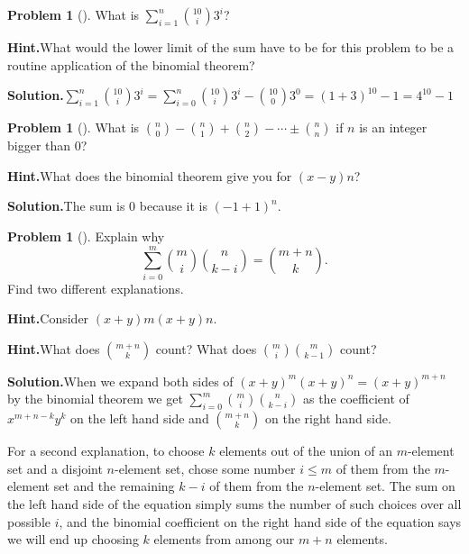 \documentclass[10pt,]{book}
\theoremstyle{plain}
\theoremstyle{definition}
\newtheorem{activity}[project]{Problem}
\theoremstyle{definition}
\numberwithin{equation}{chapter}
\begin{document}
\begin{activity}[]\label{activity-55}
What is \(\sum_{i=1}^n \binom{10}{i}3^i\)?%
\par\medskip\noindent%
\textbf{Hint.}\quad What would the lower limit of the sum have to be for this problem to be a routine application of the binomial theorem?%
\par\medskip\noindent%
\textbf{Solution.}\quad \(\sum_{i=1}^n \binom{10}{i}3^i=\sum_{i=0}^n
\binom{10}{i}3^i-\binom{10}{0}3^0 =(1+3)^{10}-1=4^{10}-1\)%
\end{activity}
\begin{activity}[]\label{activity-56}
What is \(\binom{n}{0}-\binom{n}{1}+\binom{n}{2}-\cdots \pm
\binom{n}{n}\) if \(n\) is an integer bigger than 0?%
\par\medskip\noindent%
\textbf{Hint.}\quad What does the binomial theorem give you for \((x - y)n\)?%
\par\medskip\noindent%
\textbf{Solution.}\quad The sum is \(0\) because it is \((-1+1)^n\).%
\end{activity}
\begin{activity}[]\label{activity-57}
Explain why%
\begin{equation*}
\sum_{i=0}^m\binom{m}{i}\binom{n}{k-i} = \binom{m+n}{k}.
\end{equation*}
Find two different explanations.%
\par\medskip\noindent%
\textbf{Hint.}\quad Consider \((x + y)m (x + y)n\).%
\par\medskip\noindent%
\textbf{Hint.}\quad What does \(\binom{m+n}{k}\) count? What does \(\binom{m}{i}\binom{m}{k-1}\) count?%
\par\medskip\noindent%
\textbf{Solution.}\quad When we expand both sides of \((x+y)^m(x+y)^n=(x+y)^{m+n}\) by the binomial theorem we get \(\sum_{i=0}^m\binom{m}{i}\binom{n}{k-i}\) as the coefficient of \(x^{m+n-k}y^k\) on the left hand side and \(\binom{m+n}{k}\) on the right hand side.%
\par
For a second explanation, to choose \(k\) elements out of the union of an \(m\)-element set and a disjoint \(n\)-element set, chose some number \(i\le m\) of them from the \(m\)-element set and the remaining \(k-i\) of them from the \(n\)-element set. The sum on the left hand side of the equation simply sums the number of such choices over all possible \(i\), and the binomial coefficient on the right hand side of the equation says we will end up choosing \(k\) elements from among our \(m+n\) elements.%
\end{activity}
\end{document}
